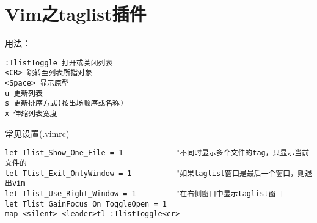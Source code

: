 \section{Vim之taglist插件}
用法：
\begin{verbatim}
:TlistToggle 打开或关闭列表
<CR> 跳转至列表所指对象
<Space> 显示原型
u 更新列表
s 更新排序方式(按出场顺序或名称)
x 伸缩列表宽度
\end{verbatim}

常见设置(.vimrc)
\begin{verbatim}
let Tlist_Show_One_File = 1            "不同时显示多个文件的tag，只显示当前文件的
let Tlist_Exit_OnlyWindow = 1          "如果taglist窗口是最后一个窗口，则退出vim
let Tlist_Use_Right_Window = 1         "在右侧窗口中显示taglist窗口
let Tlist_GainFocus_On_ToggleOpen = 1
map <silent> <leader>tl :TlistToggle<cr>
\end{verbatim}


